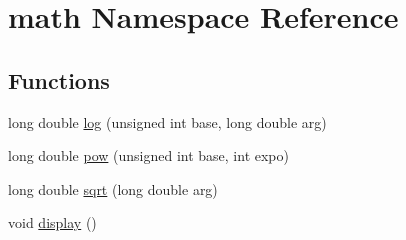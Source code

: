 \hypertarget{namespacemath}{\section{math Namespace Reference}
\label{namespacemath}
}
\subsection*{Functions}
\begin{DoxyCompactItemize}
\item 
long double \hyperlink{namespacemath_a2d6a04a1c225921b2efca7ae69b48d18}{log} (unsigned int base, long double arg)
\item 
long double \hyperlink{namespacemath_a490d14342097d706bca88b313bca5452}{pow} (unsigned int base, int expo)
\item 
long double \hyperlink{namespacemath_aa06eb703529c6bb3854cd6e6f8a30df8}{sqrt} (long double arg)
\item 
void \hyperlink{namespacemath_a97d1d5e403fd9a832a3ab56836852838}{display} ()
\end{DoxyCompactItemize}


